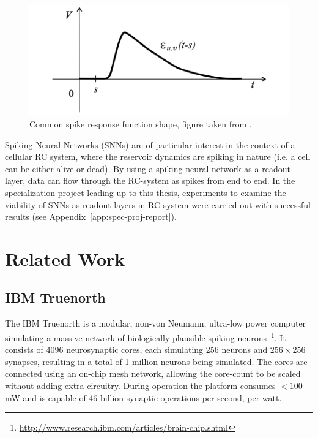 \begin{figure}[ht]
  \centering
  \includegraphics[width=0.5\linewidth]{fig/response-function-snn}
  \caption[Common spike response function shape]{Common spike response function shape, figure taken from \cite{Maass1997}.}
  \label{fig:response-function-snn}
\end{figure}


Spiking Neural Networks (SNNs) are of particular interest in the context of a cellular
RC system, where the reservoir dynamics are spiking in nature (i.e. a cell can
be either alive or dead). By using a spiking neural network as a readout layer,
data can flow through the RC-system as spikes from end to end. In the
specialization project leading up to this thesis, experiments to examine the
viability of SNNs as readout layers in RC system were carried out with successful
results (see Appendix~\ref{app:spec-proj-report}).


\section{Related Work}
\label{sec:related-work}

\subsection{IBM Truenorth}
\label{sec:truenorth}

The IBM Truenorth is a modular, non-von Neumann, ultra-low power computer
simulating a massive network of biologically plausible spiking
neurons~\footnote{\url{http://www.research.ibm.com/articles/brain-chip.shtml}}.
It consists of 4096 neurosynaptic cores, each simulating 256 neurons and
$256\times256$ synapses, resulting in a total of 1 million neurons being
simulated. The cores are connected using an on-chip mesh network, allowing the
core-count to be scaled without adding extra circuitry. During operation the
platform consumes $< 100$ mW and is capable of 46 billion synaptic operations
per second, per watt.

